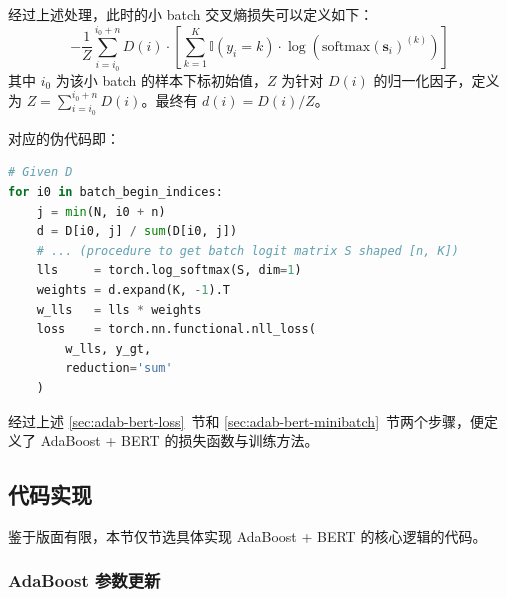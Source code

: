 \documentclass[12pt, a4paper, UTF8]{ctexart}
\begin{document}
经过上述处理，此时的小 batch 交叉熵损失可以定义如下：
$$
- \frac{1}{Z}\sum_{i=i_{0}}^{i_{0}+n} D(i) \cdot \left[ \sum_{k=1}^{K} \mathbb{I}(y_{i}=k) \cdot \log (\mathrm{softmax}(\boldsymbol{s}_{i})^{(k)}) \right]
$$
其中 $i_{0}$ 为该小 batch 的样本下标初始值，$Z$ 为针对 $D(i)$ 的归一化因子，定义为 $Z=\sum_{i=i_{0}}^{i_{0}+n} D(i)$。最终有 $d(i)=D(i)/Z$。

对应的伪代码即：

\begin{small}
\begin{lstlisting}[language=Python]
# Given D
for i0 in batch_begin_indices:
    j = min(N, i0 + n)
    d = D[i0, j] / sum(D[i0, j])
    # ... (procedure to get batch logit matrix S shaped [n, K])
    lls     = torch.log_softmax(S, dim=1)
    weights = d.expand(K, -1).T
    w_lls   = lls * weights
    loss    = torch.nn.functional.nll_loss(
        w_lls, y_gt,
        reduction='sum'
    )
\end{lstlisting}
\end{small}

经过上述 \ref{sec:adab-bert-loss}~节和 \ref{sec:adab-bert-minibatch}~节两个步骤，便定义了 AdaBoost + BERT 的损失函数与训练方法。

\subsection{代码实现}

鉴于版面有限，本节仅节选具体实现 AdaBoost + BERT 的核心逻辑的代码。

\subsubsection{AdaBoost 参数更新}
\end{document}
